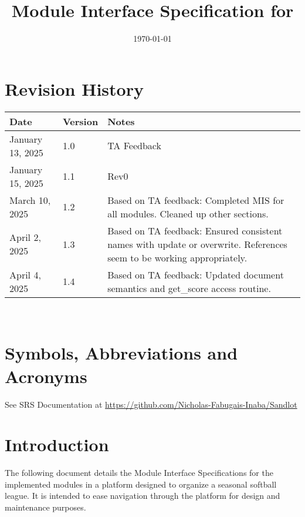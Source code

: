 \documentclass[12pt, titlepage]{article}
\begin{document}
\title{Module Interface Specification for \progname{}}

\author{\authname}

\date{\today}

\maketitle


\section{Revision History}

\begin{tabularx}{\textwidth}{p{3cm}p{2cm}X}
\toprule {\bf Date} & {\bf Version} & {\bf Notes}\\
\midrule
January 13, 2025 & 1.0 & TA Feedback\\
January 15, 2025 & 1.1 & Rev0\\
March 10, 2025 & 1.2 & Based on TA feedback: Completed MIS for all modules. Cleaned up other sections.\\
April 2, 2025 & 1.3 & Based on TA feedback: Ensured consistent names with
update or overwrite. References seem to be working appropriately.\\
April 4, 2025 & 1.4 & Based on TA feedback: Updated document semantics and
get\_score access routine.\\
\bottomrule
\end{tabularx}

~\newpage

\section{Symbols, Abbreviations and Acronyms}

See SRS Documentation at \url{https://github.com/Nicholas-Fabugais-Inaba/Sandlot}

\newpage

\tableofcontents

\newpage


\section{Introduction}

The following document details the Module Interface Specifications for
the implemented modules in a platform designed to organize a seasonal
softball league. It is intended to ease navigation through the platform
for design and maintenance purposes.
\end{document}

